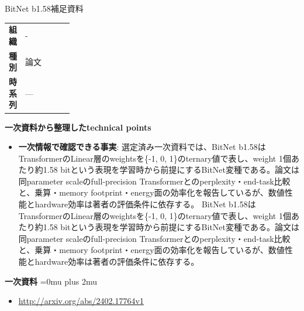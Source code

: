\begin{technicalnote}{BitNet b1.58}{補足資料}
\begingroup
\begin{tabularx}{\linewidth}{@{}>{\bfseries}p{0.22\linewidth}X@{}}
組織 & - \\
種別 & 論文 \\
時系列 & — \\
\end{tabularx}
\smallskip
\begin{minipage}{\linewidth}
{\bfseries 一次資料から整理したtechnical points}
\begin{itemize}[leftmargin=1.5em,itemsep=0.35em]
\item \textbf{一次情報で確認できる事実}: 選定済み一次資料では、BitNet b1.58はTransformerのLinear層のweightsを\{-1, 0, 1\}のternary値で表し、weight 1個あたり約1.58 bitという表現を学習時から前提にするBitNet変種である。論文は同parameter scaleのfull-precision Transformerとのperplexity・end-task比較と、乗算・memory footprint・energy面の効率化を報告しているが、数値性能とhardware効率は著者の評価条件に依存する。 BitNet b1.58はTransformerのLinear層のweightsを\{-1, 0, 1\}のternary値で表し、weight 1個あたり約1.58 bitという表現を学習時から前提にするBitNet変種である。論文は同parameter scaleのfull-precision Transformerとのperplexity・end-task比較と、乗算・memory footprint・energy面の効率化を報告しているが、数値性能とhardware効率は著者の評価条件に依存する。
\end{itemize}
\begin{minipage}{\linewidth}
\begin{samepage}
{\bfseries 一次資料}
\begingroup\sloppy
\Urlmuskip=0mu plus 2mu\relax
\begin{itemize}[leftmargin=1.5em,itemsep=0.25em]
\item {\scriptsize\url{http://arxiv.org/abs/2402.17764v1}}
\end{itemize}
\endgroup
\end{samepage}
\end{minipage}
\end{minipage}
\endgroup
\end{technicalnote}
\medskip
